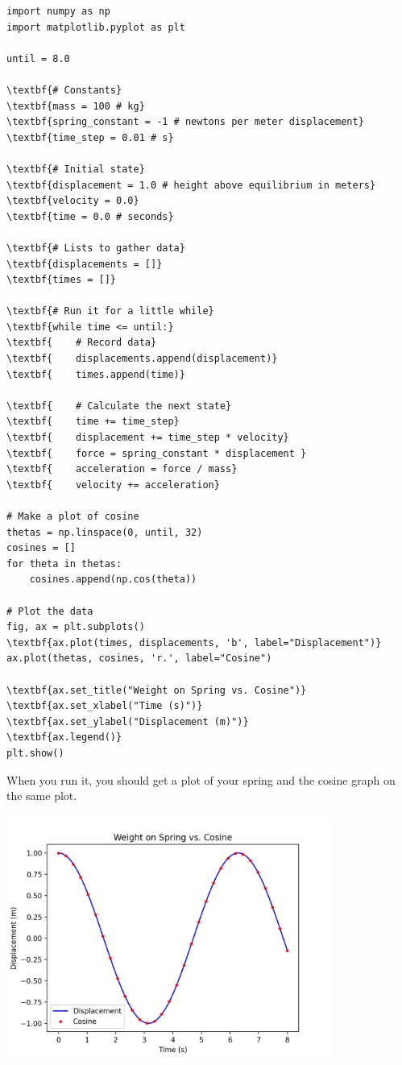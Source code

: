 \begin{Verbatim}[commandchars=\\\{\}]
import numpy as np
import matplotlib.pyplot as plt

until = 8.0

\textbf{# Constants}
\textbf{mass = 100 # kg}
\textbf{spring_constant = -1 # newtons per meter displacement}
\textbf{time_step = 0.01 # s}

\textbf{# Initial state}
\textbf{displacement = 1.0 # height above equilibrium in meters}
\textbf{velocity = 0.0}
\textbf{time = 0.0 # seconds}

\textbf{# Lists to gather data}
\textbf{displacements = []}
\textbf{times = []}

\textbf{# Run it for a little while}
\textbf{while time <= until:}
\textbf{    # Record data}
\textbf{    displacements.append(displacement)}
\textbf{    times.append(time)}

\textbf{    # Calculate the next state}
\textbf{    time += time_step}
\textbf{    displacement += time_step * velocity}
\textbf{    force = spring_constant * displacement }
\textbf{    acceleration = force / mass}
\textbf{    velocity += acceleration}

# Make a plot of cosine
thetas = np.linspace(0, until, 32)
cosines = []
for theta in thetas:
    cosines.append(np.cos(theta))

# Plot the data
fig, ax = plt.subplots()
\textbf{ax.plot(times, displacements, 'b', label="Displacement")}
ax.plot(thetas, cosines, 'r.', label="Cosine")

\textbf{ax.set_title("Weight on Spring vs. Cosine")}
\textbf{ax.set_xlabel("Time (s)")}
\textbf{ax.set_ylabel("Displacement (m)")}
\textbf{ax.legend()}
plt.show()
\end{Verbatim}
When you run it, you should get a plot of your spring and the cosine graph on the same plot.

\includegraphics[width=0.8\textwidth]{springpy.png}

